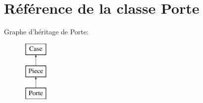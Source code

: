 \hypertarget{classPorte}{\section{\-Référence de la classe \-Porte}
\label{classPorte}
}
\-Graphe d'héritage de \-Porte\-:\begin{figure}[H]
\begin{center}
\leavevmode
\includegraphics[height=3.000000cm]{classPorte}
\end{center}
\end{figure}
